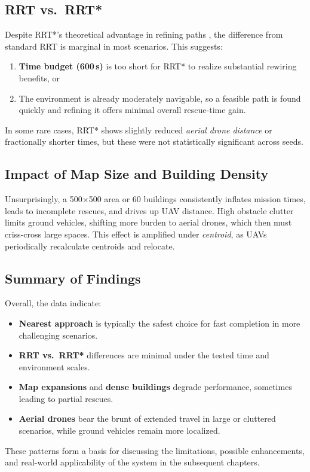 \documentclass[12pt,a4paper]{report}
\begin{document}
\subsection{RRT vs.\ RRT*}
Despite RRT*’s theoretical advantage in refining paths \cite{Karaman2011RRTstar}, the difference from standard
RRT is marginal in most scenarios. This suggests:
\begin{enumerate}
    \item \textbf{Time budget (600\,s)} is too short for RRT* to realize 
          substantial rewiring benefits, or 
    \item The environment is already moderately navigable, so a feasible 
          path is found quickly and refining it offers minimal overall rescue-time gain.
\end{enumerate}
In some rare cases, RRT* shows slightly reduced \emph{aerial drone distance} or fractionally
shorter times, but these were not statistically significant across seeds.

\subsection{Impact of Map Size and Building Density}
Unsurprisingly, a 500$\times$500 area or 60 buildings consistently inflates mission times,
leads to incomplete rescues, and drives up UAV distance. High obstacle clutter
limits ground vehicles, shifting more burden to aerial drones, which then must
criss-cross large spaces. This effect is amplified under \emph{centroid}, as UAVs
periodically recalculate centroids and relocate.

\subsection{Summary of Findings}
Overall, the data indicate:
\begin{itemize}
    \item \textbf{Nearest approach} is typically the safest choice for fast completion
          in more challenging scenarios.
    \item \textbf{RRT vs.\ RRT*} differences are minimal under the tested time and
          environment scales.
    \item \textbf{Map expansions} and \textbf{dense buildings} degrade performance,
          sometimes leading to partial rescues.
    \item \textbf{Aerial drones} bear the brunt of extended travel in large or
          cluttered scenarios, while ground vehicles remain more localized.
\end{itemize}
These patterns form a basis for discussing the limitations, possible enhancements,
and real-world applicability of the system in the subsequent chapters.
\end{document}
